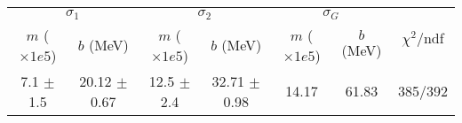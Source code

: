\begin{tabular}{cc|cc|cc||c}
\multicolumn{2}{c|}{$\sigma_1$} & \multicolumn{2}{|c}{$\sigma_2$} & \multicolumn{2}{|c}{$\sigma_G$}  & \multirow{2}{*}{$\chi^2/$ndf}\\
$m$ ($\times1e5$) & $b$ (MeV) & $m$ ($\times1e5$) & $b$ (MeV) & $m$ ($\times1e5$) & $b$ (MeV) & \\
\hline
7.1 $\pm$ 1.5 & 20.12 $\pm$ 0.67 & 12.5 $\pm$ 2.4 & 32.71 $\pm$ 0.98 & 14.17 & 61.83 & 385/392\\
\end{tabular}
